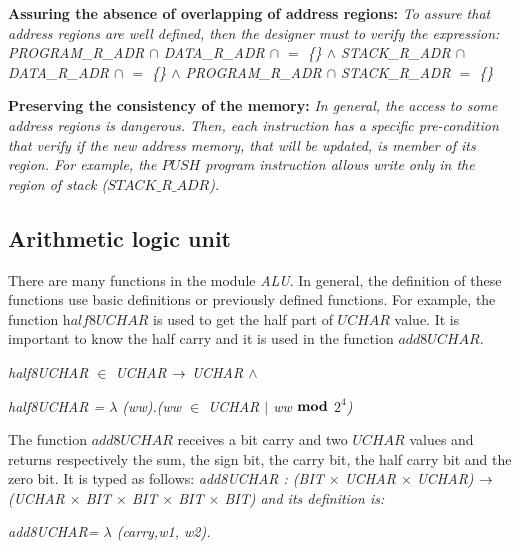 \documentclass[a4paper]{llncs}
\begin{document}
\textbf{Assuring the absence of overlapping of address regions:}
 \emph{To assure that address regions are well defined, then the designer must to verify the expression:}
\it PROGRAM\_R\_ADR $\cap$ DATA\_R\_ADR $\cap$ $=$ \{\} $\land$ STACK\_R\_ADR $\cap$ DATA\_R\_ADR $\cap$ $=$ \{\} $\land$ PROGRAM\_R\_ADR $\cap$  STACK\_R\_ADR  $=$ \{\} 
 
\textbf{Preserving the consistency of the memory:} \emph{In general, the access to
some address regions is dangerous. Then, each instruction has a specific pre-condition that verify
if the new address memory, that will be updated, is member of its region. For example, the $\textit{PUSH}$
program instruction allows write only in the region of stack ($\textit{STACK\_R\_ADR}$).}



\subsection{Arithmetic logic unit}
 
There are many functions in the module \textit{ALU}. In general, the definition of these 
functions use basic definitions or previously defined functions. For example, the function
$\textit{half8UCHAR}$ is used to get the half part of $\textit{UCHAR}$ value.
It is important to know the half carry and it is used in the function $\textit{add8UCHAR}$. 

\hspace*{0.0in}\it half8UCHAR  $\in$  \it UCHAR  $\fun$  \it UCHAR  $\land$ 

\hspace*{0.0in}\it half8UCHAR \rm =  $\lambda$  \rm (\it ww\rm )\rm .\rm (\it ww  $\in$  \it UCHAR  $\mid$  \it ww  $\mod$  \it $2^{4}$\rm )


 
The function $\textit{add8UCHAR}$ receives a bit carry and two $\textit{UCHAR}$ values and returns respectively the 
sum, the sign bit, the carry bit, the half carry bit and the zero bit. It is typed as follows: \it add8UCHAR \rm :
\rm (\it BIT $\times$ \it UCHAR $\times$ \it UCHAR\rm ) $\fun$ \rm (\it UCHAR $\times$  \it BIT  $\times$  \it BIT  $\times$  \it BIT  $\times$  \it BIT\rm ) and its definition is:

\hspace*{0.0in}\it add8UCHAR\rm = $\lambda$ \rm(\it carry\rm,\it w1\rm, \it w2\rm)\rm.\rm
\end{document}
